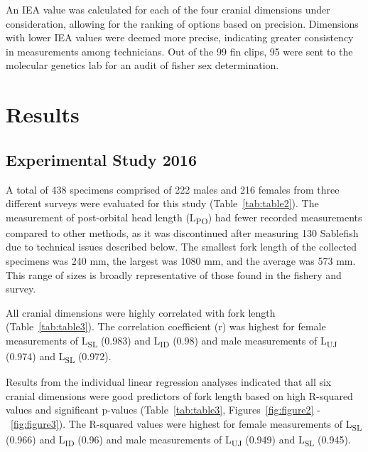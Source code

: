 \documentclass[12pt]{article}\usepackage[]{graphicx}\usepackage[]{color}
\begin{document}
An IEA value was calculated for each of the four cranial dimensions under consideration, allowing for the ranking of options based on precision. Dimensions with lower IEA values were deemed more precise, indicating greater consistency in measurements among technicians. Out of the 99 fin clips, 95 were sent to the molecular genetics lab for an audit of fisher sex determination.

\hypertarget{results}{%
\section{Results}\label{results}}

\hypertarget{experimental-study-2016-1}{%
\subsection{Experimental Study 2016}\label{experimental-study-2016-1}}

A total of 438 specimens comprised of 222 males and 216 females from three different surveys were evaluated for this study (Table~\ref{tab:table2}). The measurement of post-orbital head length (L\textsubscript{PO}) had fewer recorded measurements compared to other methods, as it was discontinued after measuring 130 Sablefish due to technical issues described below. The smallest fork length of the collected specimens was 240 mm, the largest was 1080 mm, and the average was 573 mm. This range of sizes is broadly representative of those found in the fishery and survey.

All cranial dimensions were highly correlated with fork length (Table~\ref{tab:table3}). The correlation coefficient (r) was highest for female measurements of L\textsubscript{SL} (0.983) and L\textsubscript{ID} (0.98) and male measurements of L\textsubscript{UJ} (0.974) and L\textsubscript{SL} (0.972).

Results from the individual linear regression analyses indicated that all six cranial dimensions were good predictors of fork length based on high R-squared values and significant p-values (Table~\ref{tab:table3}, Figures~\ref{fig:figure2} -~\ref{fig:figure3}). The R-squared values were highest for female measurements of L\textsubscript{SL} (0.966) and L\textsubscript{ID} (0.96) and male measurements of L\textsubscript{UJ} (0.949) and L\textsubscript{SL} (0.945).
\end{document}
